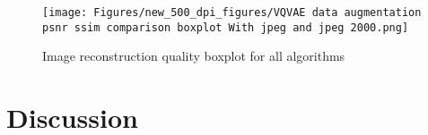 \documentclass[review]{elsarticle}
\begin{document}



\begin{figure}
\texttt{[image: Figures/new\_500\_dpi\_figures/VQVAE data augmentation psnr ssim comparison boxplot With jpeg and jpeg 2000.png]}
\caption{Image reconstruction quality boxplot for all algorithms}
\label{fig:image_reconstruction_quality_boxplot_for_all_algorithms}
\end{figure}

\section{Discussion}
\end{document}
